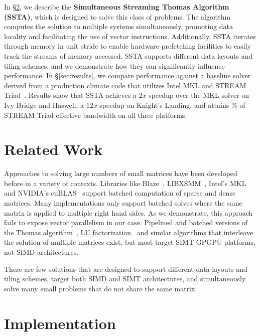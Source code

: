 \documentclass[10pt, conference, compsocconf]{IEEEtran}
\newcommand{\textapprox}{\texttildelow}
\begin{document}
In \S\ref{sec:impl}, we describe the \textbf{Simultaneous Streaming Thomas
  Algorithm (SSTA)}, which is designed to solve this class of problems. 
The algorithm computes the solution to multiple systems simultaneously,
  promoting data locality and facilitating the use of vector instructions.
Additionally, SSTA iterates through memory in unit stride to enable 
  hardware prefetching facilities to easily track the streams of memory
  accessed.
SSTA supports different data layouts and tiling schemes, and we demonstrate how
  they can significantly influence performance.
In \S\ref{sec:results}, we compare performance against a baseline solver derived
  from a production climate code that utilizes Intel MKL and STREAM
  Triad~\cite{stream}.
Results show that SSTA achieves a \textapprox \(2x\) speedup over the MKL solver
  on Ivy Bridge and Haswell, a \textapprox \(12x\) speedup on Knight's Landing,
  and attains \textapprox 90\% of STREAM Triad effective bandwidth on all three
  platforms.

\section{Related Work}
\label{sec:related}

Approaches to solving large numbers of small matrices have been 
  developed before in a variety of contexts.
Libraries like Blaze~\cite{blaze,blaze_git}, LIBXSMM~\cite{libxsmm,libxsmm_git},
  Intel's MKL~\cite{mkl} and NVIDIA's cuBLAS~\cite{cublas} support batched
  computation of sparse and dense matrices.
Many implementations only support batched solves where the same matrix is
  applied to multiple right hand sides.
As we demonstrate, this approach fails to expose vector parallelism in our case.
Pipelined and batched versions of the Thomas
  algorithm~\cite{pipelined_thomas_algorithm}, LU
  factorization~\cite{batched_lu_haidar} and similar algorithms that 
  interleave the solution of multiple matrices exist, but most
  target SIMT GPGPU platforms, not SIMD architectures.

There are few solutions that are designed to support different data layouts
  and tiling schemes, target both SIMD and SIMT architectures, and
  simultaneously solve many small problems that do not share the same matrix.

\section{Implementation}
\label{sec:impl}
\end{document}
